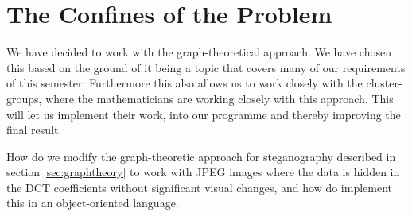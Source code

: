 \section{The Confines of the Problem}
We have decided to work with the graph-theoretical approach. 
We have chosen this based on the ground of it being a topic that covers many of our requirements of this semester. 
Furthermore this also allows us to work closely with the cluster-groups, where the mathematicians are working closely with this approach. 
This will let us implement their work, into our programme and thereby improving the final result.

\vspace{5mm}
\begin{centering}
	\begin{tcolorbox}[center title, title=Problem Statement, width=.7\textwidth]
		How do we modify the graph-theoretic approach for steganography described in section \ref{sec:graphtheory} to work with JPEG images where the data is hidden in the DCT coefficients without significant visual changes, and how do implement this in an object-oriented language.  
	\end{tcolorbox}
\end{centering}